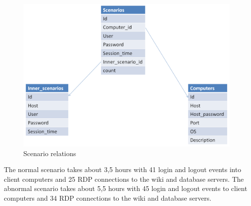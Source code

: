 \begin{figure}[ht!]
\centering
\includegraphics[width=\textwidth]{scenario_relations.png}
\caption{Scenario relations}
\label{overflow}
\end{figure}


The normal scenario takes about 3,5 hours with 41 login and logout events into client computers and 25 RDP connections to the wiki and database servers. The abnormal scenario takes about 5,5 hours with 45 login and logout events to client computers and 34 RDP connections to the wiki and database servers.
 
% 